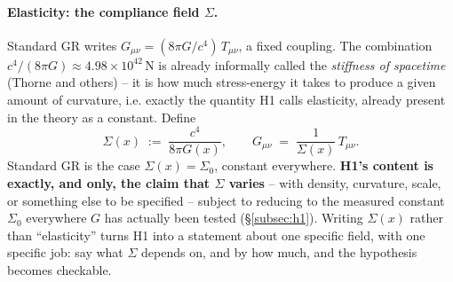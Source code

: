 \documentclass[12pt, a4paper]{article}
\begin{document}
\paragraph{Elasticity: the compliance field $\Sigma$.}
Standard GR writes $G_{\mu\nu} = (8\pi G/c^4)\,T_{\mu\nu}$, a fixed
coupling. The combination $c^4/(8\pi G) \approx 4.98\times10^{42}\,
\mathrm{N}$ is already informally called the \emph{stiffness of
spacetime} (Thorne and others) -- it is how much stress-energy it
takes to produce a given amount of curvature, i.e. exactly the
quantity H1 calls elasticity, already present in the theory as a
constant. Define
\begin{equation}
\Sigma(x) \;:=\; \frac{c^4}{8\pi G(x)}, \qquad
G_{\mu\nu} \;=\; \frac{1}{\Sigma(x)}\,T_{\mu\nu}.
\end{equation}
Standard GR is the case $\Sigma(x) = \Sigma_0$, constant everywhere.
\textbf{H1's content is exactly, and only, the claim that $\Sigma$
varies} -- with density, curvature, scale, or something else to be
specified -- subject to reducing to the measured constant $\Sigma_0$
everywhere $G$ has actually been tested (\S\ref{subsec:h1}). Writing
$\Sigma(x)$ rather than ``elasticity'' turns H1 into a statement about
one specific field, with one specific job: say what $\Sigma$ depends
on, and by how much, and the hypothesis becomes checkable.
\end{document}
